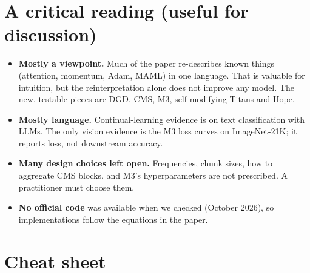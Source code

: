 \documentclass[11pt,a4paper]{article}
\begin{document}
\section{A critical reading (useful for discussion)}

\begin{itemize}
  \item \textbf{Mostly a viewpoint.} Much of the paper re-describes known things (attention, momentum, Adam, MAML) in one language. That is valuable for intuition, but the reinterpretation alone does not improve any model. The new, testable pieces are DGD, CMS, M3, self-modifying Titans and Hope.
  \item \textbf{Mostly language.} Continual-learning evidence is on text classification with LLMs. The only vision evidence is the M3 loss curves on ImageNet-21K; it reports loss, not downstream accuracy.
  \item \textbf{Many design choices left open.} Frequencies, chunk sizes, how to aggregate CMS blocks, and M3's hyperparameters are not prescribed. A practitioner must choose them.
  \item \textbf{No official code} was available when we checked (October 2026), so implementations follow the equations in the paper.
\end{itemize}

\section{Cheat sheet}
\end{document}
